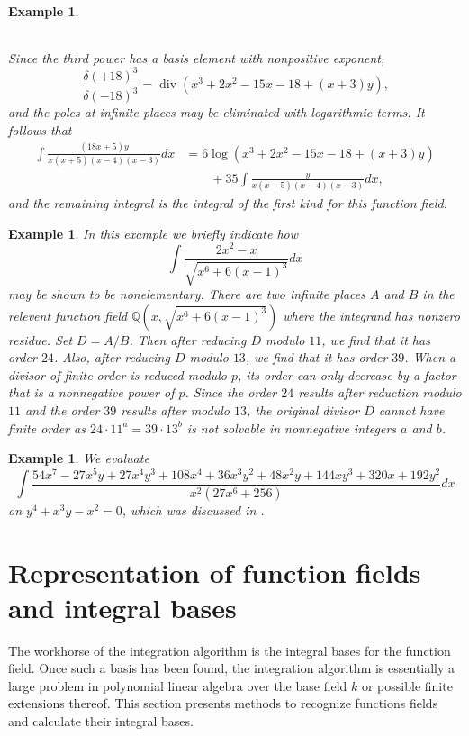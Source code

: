 \documentclass[12pt,reqno]{amsart}
\numberwithin{equation}{section}
\newtheorem{example}[theorem]{Example}
\newcommand{\op}[1]  { \operatorname{ #1 }}
\newcommand{\bbQ}[0]  { \mathbb{Q}}
\begin{document}
\begin{example}
\begin{center}
\begin{tabular}{l|ll}
\hline
\end{tabular} 
\end{center}
Since the third power has a basis element with nonpositive exponent,
\begin{equation*}
\frac{\delta(+18)^3}{\delta(-18)^3} = \op{div}(x^3+2 x^2-15 x-18+(x+3) y)\text{,}
\end{equation*}
and the poles at infinite places may be eliminated with logarithmic terms. It follows that
\begin{align*}
 \int \frac{(18x+5)y}{x (x+5)(x-4)(x-3)} dx &= 6\log(x^3+2x^2-15x-18+(x+3)y)\\
& \quad \quad  + 35 \int \frac{y}{x (x+5)(x-4) (x-3)} dx
\text{,}
\end{align*}
and the remaining integral is the integral of the first kind for this function field.
\end{example}


\begin{example}
 In this example we briefly indicate how
\begin{equation*}
\int \frac{2x^2-x}{\sqrt{x^6+6(x-1)^3}} dx 
\end{equation*}
may be shown to be nonelementary. There are two infinite places $A$ and $B$ in the relevent function field $\bbQ(x,\sqrt{x^6+6(x-1)^3})$ where the integrand has nonzero residue. Set $D=A/B$. Then after reducing $D$ modulo $11$, we find that it has order $24$. Also, after reducing $D$ modulo $13$, we find that it has order $39$. When a divisor of finite order is reduced modulo $p$, its order can only decrease by a factor that is a nonnegative power of $p$. Since the order $24$ results after reduction modulo $11$ and the order $39$ results after modulo $13$, the original divisor $D$ cannot have finite order as $24 \cdot 11^a = 39 \cdot 13^b$ is not solvable in nonnegative integers $a$ and $b$.
\end{example}

\begin{example}
 We evaluate
\begin{equation*}
 \int \frac{54 x^7-27 x^5 y+27 x^4 y^3+108 x^4+36 x^3 y^2+48 x^2 y+144 x y^3+320 x+192 y^2}{x^2 (27 x^6+256)} dx
\end{equation*}
on $y^4+x^3 y-x^2=0$, which was discussed in \cite[Section 5.2]{hoeji2}.

\end{example}




\section{Representation of function fields and integral bases}
\label{section_intbasis}
The workhorse of the integration algorithm is the integral bases for the function field. Once such a basis has been found, the integration algorithm is essentially a large problem in polynomial linear algebra over the base field $k$ or possible finite extensions thereof. This section presents methods to recognize functions fields and calculate their integral bases.
\end{document}
